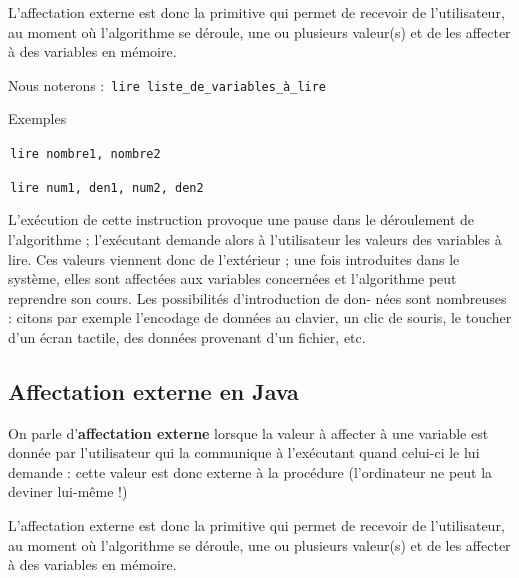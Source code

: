 \documentclass[11pt,a4paper]{article}
\begin{document}
            \par
        
          L'affectation externe est donc la primitive qui permet de recevoir de l'utilisateur, au moment
          o\`u l'algorithme se d\'eroule, une ou plusieurs valeur(s) et de les affecter \`a des variables en
          m\'emoire. 
        
            \par
        
          Nous noterons :
          \,\verb|lire liste_de_variables_à_lire|\,
            \par
        
          Exemples \par
				\par
				\,\verb|lire nombre1, nombre2|\,\par
				\par
				\,\verb|lire num1, den1, num2, den2|\,
            \par
        
          L'ex\'ecution de cette instruction provoque une pause dans le d\'eroulement de l'algorithme ;
          l'ex\'ecutant demande alors \`a l'utilisateur les valeurs des variables \`a lire. Ces valeurs viennent
          donc de l'ext\'erieur ; une fois introduites dans le syst\`eme, elles sont affect\'ees aux variables
          concern\'ees et l'algorithme peut reprendre son cours. Les possibilit\'es d'introduction de don-
          n\'ees sont nombreuses : citons par exemple l'encodage de donn\'ees au clavier, un clic de souris,
          le toucher d'un \'ecran tactile, des donn\'ees provenant d'un fichier, etc.
        
            \par
        \subsection{Affectation externe en Java}
          On parle d'\textbf{affectation externe} lorsque la valeur \`a affecter \`a une variable
           est donn\'ee par l'utilisateur qui la communique \`a l'ex\'ecutant quand celui-ci le lui demande : cette valeur est
          donc externe \`a la proc\'edure (l'ordinateur ne peut la deviner lui-m\^eme !)
        
            \par
        
          L'affectation externe est donc la primitive qui permet de recevoir de l'utilisateur, au moment
          o\`u l'algorithme se d\'eroule, une ou plusieurs valeur(s) et de les affecter \`a des variables en
          m\'emoire. 
        
\end{document}
